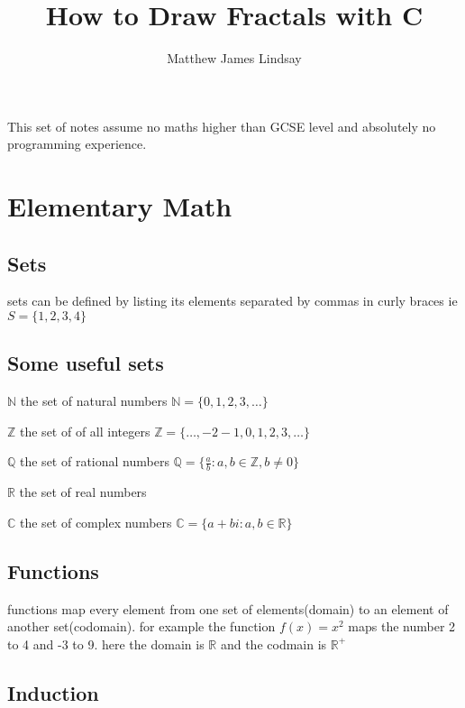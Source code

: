\documentclass[12pt]{article}
\begin{document}
\begin{titlepage}
    
    {\centering
        \title{{How to Draw Fractals with C}\\}
        \author{Matthew James Lindsay}
    }
        
    \clearpage\maketitle
    \thispagestyle{empty}
\end{titlepage}

\tableofcontents
\clearpage

\setcounter{page}{1}
    This set of notes assume no maths higher than GCSE level
     and absolutely no programming experience. 

\section{Elementary Math}
\subsection{Sets}
    sets can be defined by listing its elements separated by commas in curly 
    braces ie $S = \{1,2,3,4\}$
    
\subsection{Some useful sets}
    $\mathbb{N}$ the set of natural numbers $ \mathbb{N}=\{0,1,2,3,\ldots\} $
    
    $\mathbb{Z}$ the set of of all integers $\mathbb{Z} = \{\ldots,-2-1,0,1,2,3,\ldots\}$

    $\mathbb{Q}$ the set of rational numbers $\mathbb{Q} = \{\frac{a}{b} : a,b \in\mathbb{Z}, b \neq 0\}$

    $\mathbb{R}$ the set of real numbers

    $\mathbb{C}$ the set of complex numbers $\mathbb{C} = \{a+bi : a, b \in \mathbb{R}\}$
\subsection{Functions}
    functions map every element from one set of elements(domain) to an element of another set(codomain).
    for example the function $f(x) = x^2$ maps the number 2 to 4 and -3 to 9. here the domain is 
    $\mathbb{R}$ and the codmain is $\mathbb{R^+}$
\subsection{Induction}
\end{document}
